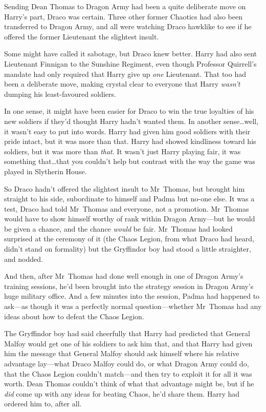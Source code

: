 Sending Dean Thomas to Dragon Army had been a quite deliberate move on Harry's part, Draco was certain. Three other former Chaotics had also been transferred to Dragon Army, and all were watching Draco hawklike to see if he offered the former Lieutenant the slightest insult.

Some might have called it sabotage, but Draco knew better. Harry had also sent Lieutenant Finnigan to the Sunshine Regiment, even though Professor Quirrell's mandate had only required that Harry give up \emph{one} Lieutenant. That too had been a deliberate move, making crystal clear to everyone that Harry \emph{wasn't} dumping his least-favoured soldiers.

In one sense, it might have been easier for Draco to win the true loyalties of his new soldiers if they'd thought Harry hadn't wanted them. In another sense…well, it wasn't easy to put into words. Harry had given him good soldiers with their pride intact, but it was more than that. Harry had showed kindliness toward his soldiers, but it was more than \emph{that}. It wasn't just Harry playing fair, it was something that…that you couldn't help but contrast with the way the game was played in Slytherin House.

So Draco hadn't offered the slightest insult to Mr~Thomas, but brought him straight to his side, subordinate to himself and Padma but no-one else. It was a test, Draco had told Mr~Thomas and everyone, not a promotion. Mr~Thomas would have to show himself worthy of rank within Dragon Army—but he would be given a chance, and the chance \emph{would} be fair. Mr~Thomas had looked surprised at the ceremony of it (the Chaos Legion, from what Draco had heard, didn't stand on formality) but the Gryffindor boy had stood a little straighter, and nodded.

And then, after Mr~Thomas had done well enough in one of Dragon Army's training sessions, he'd been brought into the strategy session in Dragon Army's huge military office. And a few minutes into the session, Padma had happened to ask—as though it was a perfectly normal question—whether Mr~Thomas had any ideas about how to defeat the Chaos Legion.

The Gryffindor boy had said cheerfully that Harry had predicted that General Malfoy would get one of his soldiers to ask him that, and that Harry had given him the message that General Malfoy should ask himself where his relative advantage lay—what Draco Malfoy could do, or what Dragon Army could do, that the Chaos Legion couldn't match—and then try to exploit it for all it was worth. Dean Thomas couldn't think of what that advantage might be, but if he \emph{did} come up with any ideas for beating Chaos, he'd share them. Harry had ordered him to, after all.

